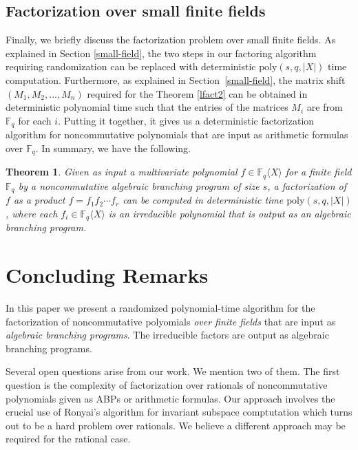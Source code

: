 \documentclass[10pt,a4paper]{article}
\newtheorem{theorem}{Theorem}[section]
\newcommand{\F}{\mathbb{F}}
\renewcommand{\angle}[1]{\langle #1 \rangle}
\newcommand{\poly}{\mathrm{poly}}
\begin{document}
%
%
%
%
%
%
%
%
%
%
%
%
%
%
%
%
%
%
%



\subsection{Factorization over small finite fields}

Finally, we briefly discuss the factorization problem over small
finite fields.  As explained in Section \ref{small-field}, the two
steps in our factoring algorithm requiring randomization can be
replaced with deterministic $\poly(s, q, |X|)$ time
computation. Furthermore, as explained in Section~\ref{small-field},
the matrix shift $(M_1, M_2, \ldots, M_n)$ required for the Theorem
\ref{lfact2} can be obtained in deterministic polynomial time such
that the entries of the matrices $M_i$ are from $\F_q$ for each $i$.
Putting it together, it gives us a deterministic factorization
algorithm for noncommutative polynomials that are input as arithmetic
formulas over $\F_q$. In summary, we have the following.

\begin{theorem}
Given as input a multivariate polynomial $f\in\F_q\angle{X}$ for a
finite field $\F_q$ by a noncommutative algebraic branching program of size
$s$, a factorization of $f$ as a product $f=f_1f_2\cdots f_r$ can be
computed in deterministic time $\poly(s,q,|X|)$, where each
$f_i\in\F_q\angle{X}$ is an irreducible polynomial that is output as
an algebraic branching program.
\end{theorem}



\section{Concluding Remarks}

In this paper we present a randomized polynomial-time algorithm for
the factorization of noncommutative polyomials \emph{over finite
  fields} that are input as \emph{algebraic branching programs}. The
irreducible factors are output as algebraic branching programs.

Several open questions arise from our work. We mention two of them.
The first question is the complexity of factorization over rationals
of noncommutative polynomials given as ABPs or arithmetic formulas. Our
approach involves the crucial use of Ronyai's algorithm for invariant
subspace comptutation which turns out to be a hard problem over
rationals.  We believe a different approach may be required for the
rational case.
\end{document}
